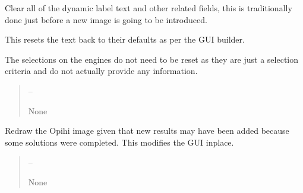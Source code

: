 \documentclass[letterpaper,11pt,english]{sphinxmanual}
\begin{document}
\begin{savenotes}
\begin{fulllineitems}
\begin{savenotes}\begin{fulllineitems}
\label{\detokenize{code/opihiexarata.gui.manual:opihiexarata.gui.manual.OpihiManualWindow.clear_dynamic_label_text}}
\pysigstartsignatures
{}
\pysigstopsignatures
\sphinxAtStartPar
Clear all of the dynamic label text and other related fields,
this is traditionally done just before a new image is going to be
introduced.

\sphinxAtStartPar
This resets the text back to their defaults as per the GUI builder.

\sphinxAtStartPar
The selections on the engines do not need to be reset as they are
just a selection criteria and do not actually provide any information.
\begin{quote}\begin{description}
\sphinxAtStartPar
{} – 

\sphinxAtStartPar
None

\end{description}\end{quote}

\end{fulllineitems}\end{savenotes}


\begin{savenotes}\begin{fulllineitems}
\label{\detokenize{code/opihiexarata.gui.manual:opihiexarata.gui.manual.OpihiManualWindow.redraw_opihi_image}}
\pysigstartsignatures
{}
\pysigstopsignatures
\sphinxAtStartPar
Redraw the Opihi image given that new results may have been added
because some solutions were completed. This modifies the GUI in\sphinxhyphen{}place.
\begin{quote}\begin{description}
\sphinxAtStartPar
{} – 

\sphinxAtStartPar
None


\end{description}
\end{quote}
\end{fulllineitems}
\end{savenotes}
\end{fulllineitems}
\end{savenotes}
\end{document}
